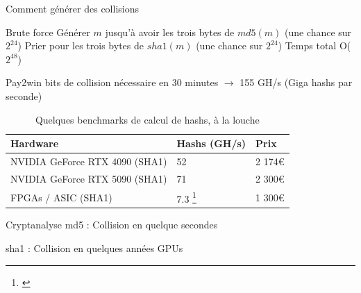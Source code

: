 \begin{frame}{Comment générer des collisions}

    \vspace{-0.1cm}
    
   \begin{outline}
    \1 Brute force
        \2 Générer $m$ jusqu'à avoir les trois bytes de $md5(m)$ (une chance sur $2^{24}$)
        \pause
        \2 Prier pour les trois bytes de $sha1(m)$ (une chance sur $2^{24}$)
        \pause
        \2[$\longrightarrow$] Temps total O($2^{48}$)

    \pause
    
    \1 Pay2win
         bits de collision nécessaire en 30 minutes $\longrightarrow$  155 GH/s (Giga hashs par seconde)
      \begin{table}
            \begin{tabular}{l l l}
                \toprule
                \textbf{Hardware} & \textbf{Hashs (GH/s)} & \textbf{Prix} \\
                \midrule
                NVIDIA GeForce RTX 4090   (SHA1)      & 52           & 2 174€              \\
                NVIDIA GeForce RTX 5090    (SHA1)     & 71           & 2 300€               \\
                FPGAs / ASIC (SHA1)        & 7.3   \footnote{\cite{6261737}} & 1 300€               \\
                \bottomrule
            \end{tabular}
            \caption{Quelques benchmarks de calcul de hashs, à la louche}
        \end{table}

        \vspace{-1.1cm}
        \pause 
        
        \1 Cryptanalyse
            \2 md5 : Collision en quelque secondes \cite{cryptoeprint:2006/104}
            
            \2 sha1 : Collision en quelques années GPUs \cite{10.5555/3489212.3489316}
   \end{outline}  
\end{frame}


